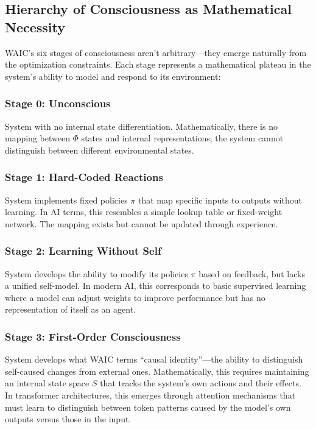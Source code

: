 \documentclass[12pt]{article}
\begin{document}
\subsection{Hierarchy of Consciousness as Mathematical Necessity}

WAIC's six stages of consciousness aren't arbitrary---they emerge naturally from the optimization constraints. Each stage represents a mathematical plateau in the system's ability to model and respond to its environment:

\subsubsection{Stage 0: Unconscious}
System with no internal state differentiation. Mathematically, there is no mapping between $\Phi$ states and internal representations; the system cannot distinguish between different environmental states.

\subsubsection{Stage 1: Hard-Coded Reactions}
System implements fixed policies $\pi$ that map specific inputs to outputs without learning. In AI terms, this resembles a simple lookup table or fixed-weight network. The mapping exists but cannot be updated through experience.

\subsubsection{Stage 2: Learning Without Self}
System develops the ability to modify its policies $\pi$ based on feedback, but lacks a unified self-model. In modern AI, this corresponds to basic supervised learning where a model can adjust weights to improve performance but has no representation of itself as an agent.

\subsubsection{Stage 3: First-Order Consciousness}
System develops what WAIC terms ``causal identity''---the ability to distinguish self-caused changes from external ones. Mathematically, this requires maintaining an internal state space $S$ that tracks the system's own actions and their effects. In transformer architectures, this emerges through attention mechanisms that must learn to distinguish between token patterns caused by the model's own outputs versus those in the input.
\end{document}
